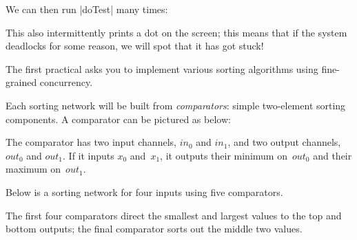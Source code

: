 We can then run |doTest| many times:
%
%
This also intermittently prints a dot on the screen; this means that if the
system deadlocks for some reason, we will spot that it has got stuck!



The first practical asks you to implement various sorting algorithms using
fine-grained concurrency.  

Each sorting network will be built from \emph{comparators}: simple
two-element sorting components.  A comparator can be pictured as below: 
%
\begin{center}
\end{center}
%
The comparator has two input channels, $in_0$ and $in_1$, and two output
channels, $out_0$ and $out_1$.  If it inputs $x_0$ and~$x_1$, it outputs their
minimum on~$out_0$ and their maximum on~$out_1$.


Below is a sorting network for four inputs using five comparators.
%
\begin{center}
\end{center}
%
The first four comparators direct the smallest and largest values to the top
and bottom outputs; the final comparator sorts out the middle two values.

